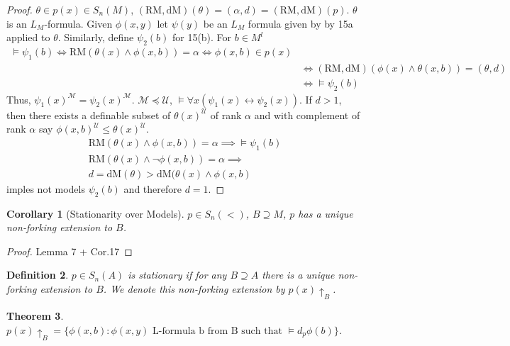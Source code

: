 \documentclass[letterpaper, 12pt]{article}
\newcommand{\cU}{\mathcal{U}}
\newcommand{\cM}{\mathcal{M}}
\newcommand{\RM}{\mbox{RM}}
\newcommand{\dM}{\mbox{dM}}
\theoremstyle{stdthm}
\newtheorem{thm}{Theorem}[section]
\newtheorem{cor}[thm]{Corollary}
\theoremstyle{stddef}
\newtheorem{defn}[thm]{Definition}
\theoremstyle{stdnonum}
\theoremstyle{stdqands}
\theoremstyle{stdbold}
\begin{document}
\begin{proof}
$\theta \in p(x) \in S_n(M)$, $(\RM,\dM) (\theta) = (\alpha, d) = (\RM,\dM)(p)$. $\theta$ is an $L_M$-formula. Given $\phi(x,y)$ let $\psi(y)$ be an $L_M$ formula given by by 15a applied to $\theta$. Similarly, define $\psi_2(b)$ for 15(b). For $b \in M^l$ 
\begin{align*}
\models \psi_1(b) \iff \RM(\theta(x) \wedge \phi(x,b)) = \alpha \iff \phi(x,b) \in p(x) \\
& \iff (\RM,\dM)(\phi(x) \wedge \theta(x,b)) = (\theta, d)\\
&\iff \models \psi_2(b)
\end{align*}
Thus, $\psi_1(x)^\cM = \psi_2(x)^\cM$. $\cM \preceq \cU$, $\models \forall x(\psi_1(x) \leftrightarrow \psi_2(x))$. If $d>1$, then there exists a definable subset of $\theta(x)^\cU$ of rank $\alpha$ and with complement of rank $\alpha$ say $\phi(x,b)^\cU \leq \theta(x)^\cU$. \\
\begin{align*}
\RM(\theta(x) \wedge \phi(x,b)) = \alpha \implies \models \psi_1(b) \\
\RM(\theta(x) \wedge \neg \phi(x,b)) = \alpha \implies\\
d = \dM(\theta) > \dM(\theta(x) \wedge \phi(x,b)
\end{align*}
imples not models $\psi_2(b)$ and therefore $d=1$. 


\end{proof}

\begin{cor} [Stationarity over Models]
$p \in S_n(<)$, $B \supseteq M$, $p$ has a unique non-forking extension to $B$. 

\end{cor}


\begin{proof}
Lemma 7 + Cor.17
\end{proof}

\begin{defn}
$p \in S_n(A) $ is stationary if for any $B \supseteq A$ there is a unique non-forking extension to $B$. We denote this non-forking extension by $p(x) \uparrow_B$. 
\end{defn}


\begin{thm}
$p(x)\uparrow_B = \{\phi(x,b): \phi(x,y) \mbox{ L-formula b from B such that }\models d_p \phi(b)\}$. 
\end{thm}
\end{document}
